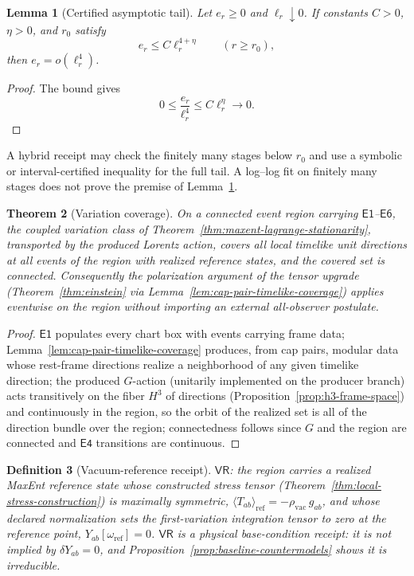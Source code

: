\documentclass[11pt]{article}
\newtheorem{theorem}{Theorem}[section]
\newtheorem{lemma}[theorem]{Lemma}
\newtheorem{definition}[theorem]{Definition}
\begin{document}
\begin{lemma}[Certified asymptotic tail]
\label{lem:certified-asymptotic-tail}
Let \(e_r\geq0\) and \(\ell_r\downarrow0\). If constants \(C>0\),
\(\eta>0\), and \(r_0\) satisfy
\[
e_r\leq C\ell_r^{4+\eta}\qquad(r\geq r_0),
\]
then \(e_r=o(\ell_r^4)\).
\end{lemma}

\begin{proof}
The bound gives
\[
0\leq\frac{e_r}{\ell_r^4}\leq C\ell_r^\eta\longrightarrow0.
\]
\end{proof}

A hybrid receipt may check the finitely many stages below \(r_0\) and use a
symbolic or interval-certified inequality for the full tail. A log--log fit
on finitely many stages does not prove the premise of
Lemma~\ref{lem:certified-asymptotic-tail}.

\begin{theorem}[Variation coverage]
\label{thm:variation-coverage}
On a connected event region carrying \(\mathsf{E1}\)--\(\mathsf{E6}\), the
coupled variation class of Theorem~\ref{thm:maxent-lagrange-stationarity},
transported by the produced Lorentz action, covers all local timelike unit
directions at all events of the region with realized reference states, and
the covered set is connected. Consequently the polarization argument of the
tensor upgrade (Theorem~\ref{thm:einstein} via
Lemma~\ref{lem:cap-pair-timelike-coverage}) applies eventwise on the region
without importing an external all-observer postulate.
\end{theorem}

\begin{proof}
\(\mathsf{E1}\) populates every chart box with events carrying frame data;
Lemma~\ref{lem:cap-pair-timelike-coverage} produces, from cap pairs, modular
data whose rest-frame directions realize a neighborhood of any given
timelike direction; the produced \(G\)-action (unitarily implemented on the
producer branch) acts transitively on the fiber \(H^3\) of directions
(Proposition~\ref{prop:h3-frame-space}) and continuously in the region, so
the orbit of the realized set is all of the direction bundle over the
region; connectedness follows since \(G\) and the region are connected and
\(\mathsf{E4}\) transitions are continuous.
\end{proof}

\begin{definition}[Vacuum-reference receipt]
\label{def:vacuum-reference-receipt}
\(\mathsf{VR}\): the region carries a realized MaxEnt reference state whose
constructed stress tensor (Theorem~\ref{thm:local-stress-construction}) is
maximally symmetric,
\(\langle T_{ab}\rangle_{\mathrm{ref}}=-\rho_{\mathrm{vac}}\,g_{ab}\), and
whose declared normalization sets the first-variation integration tensor to
zero at the reference point,
\(Y_{ab}[\omega_{\mathrm{ref}}]=0\). \(\mathsf{VR}\) is a physical
base-condition receipt: it is \emph{not} implied by
\(\delta Y_{ab}=0\), and Proposition~\ref{prop:baseline-countermodels} shows
it is irreducible.
\end{definition}
\end{document}
